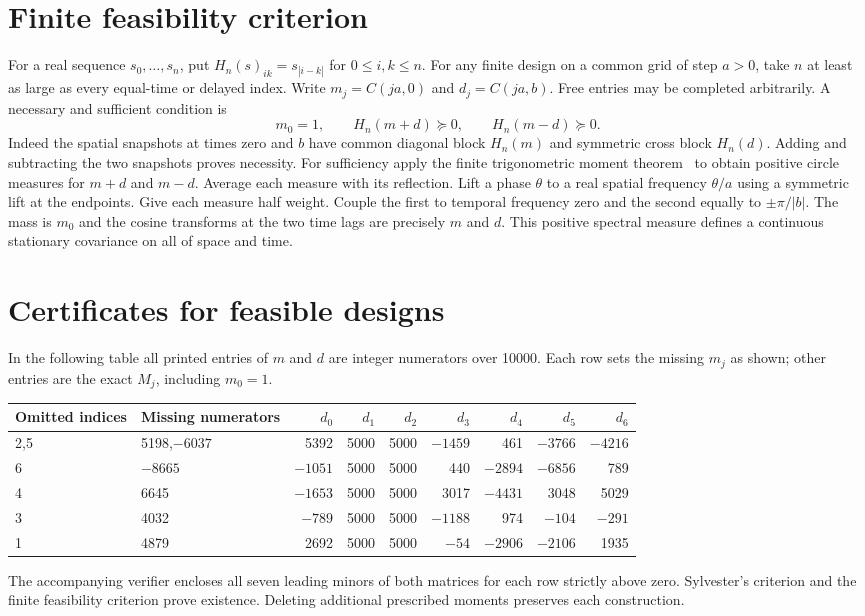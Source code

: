 \documentclass[11pt]{article}
\begin{document}
\section{Finite feasibility criterion}
For a real sequence $s_0,\ldots,s_n$, put $H_n(s)_{ik}=s_{|i-k|}$ for $0\le i,k\le n$. For any finite design on a common grid of step $a>0$, take $n$ at least as large as every equal-time or delayed index. Write $m_j=C(ja,0)$ and $d_j=C(ja,b)$. Free entries may be completed arbitrarily. A necessary and sufficient condition is
\[
 m_0=1,\qquad H_n(m+d)\succeq0,\qquad H_n(m-d)\succeq0.
\]
Indeed the spatial snapshots at times zero and $b$ have common diagonal block $H_n(m)$ and symmetric cross block $H_n(d)$. Adding and subtracting the two snapshots proves necessity. For sufficiency apply the finite trigonometric moment theorem~\cite[Ch.~11]{sch} to obtain positive circle measures for $m+d$ and $m-d$. Average each measure with its reflection. Lift a phase $\theta$ to a real spatial frequency $\theta/a$ using a symmetric lift at the endpoints. Give each measure half weight. Couple the first to temporal frequency zero and the second equally to $\pm\pi/|b|$. The mass is $m_0$ and the cosine transforms at the two time lags are precisely $m$ and $d$. This positive spectral measure defines a continuous stationary covariance on all of space and time.

\section{Certificates for feasible designs}
In the following table all printed entries of $m$ and $d$ are integer numerators over 10000. Each row sets the missing $m_j$ as shown; other entries are the exact $M_j$, including $m_0=1$.
\begin{center}\small
\begin{tabular}{llrrrrrrr}\toprule
Omitted indices & Missing numerators & $d_0$ & $d_1$ & $d_2$ & $d_3$ & $d_4$ & $d_5$ & $d_6$\\\midrule
2,5 & 5198,$-6037$ &5392&5000&5000&$-1459$&461&$-3766$&$-4216$\\
6 & $-8665$ &$-1051$&5000&5000&440&$-2894$&$-6856$&789\\
4 & 6645 &$-1653$&5000&5000&3017&$-4431$&3048&5029\\
3 & 4032 &$-789$&5000&5000&$-1188$&974&$-104$&$-291$\\
1 & 4879 &2692&5000&5000&$-54$&$-2906$&$-2106$&1935\\\bottomrule
\end{tabular}
\end{center}
The accompanying verifier encloses all seven leading minors of both matrices for each row strictly above zero. Sylvester's criterion and the finite feasibility criterion prove existence. Deleting additional prescribed moments preserves each construction.
\end{document}
